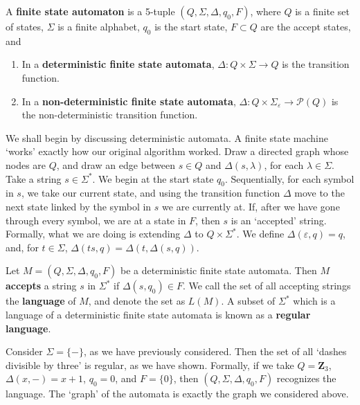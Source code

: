 \begin{definition}
    A {\bf finite state automaton} is a 5-tuple $(Q, \Sigma, \Delta, q_0, F)$, where $Q$ is a finite set of states, $\Sigma$ is a finite alphabet, $q_0$ is the start state, $F \subset Q$ are the accept states, and
    \begin{enumerate}
        \item In a {\bf deterministic finite state automata}, $\Delta: Q \times \Sigma \to Q$ is the transition function.
        \item In a {\bf non-deterministic finite state automata}, $\Delta: Q \times \Sigma_\varepsilon \to \mathcal{P}(Q)$ is the non-deterministic transition function.
    \end{enumerate}
\end{definition}

We shall begin by discussing deterministic automata. A finite state machine `works' exactly how our original algorithm worked. Draw a directed graph whose nodes are $Q$, and draw an edge between $s \in Q$ and $\Delta(s, \lambda)$, for each $\lambda \in \Sigma$. Take a string $s \in \Sigma^*$. We begin at the start state $q_0$. Sequentially, for each symbol in $s$, we take our current state, and using the transition function $\Delta$ move to the next state linked by the symbol in $s$ we are currently at. If, after we have gone through every symbol, we are at a state in $F$, then $s$ is an `accepted' string. Formally, what we are doing is extending $\Delta$ to $Q \times \Sigma^*$. We define $\Delta(\varepsilon, q) = q$, and, for $t \in \Sigma$, $\Delta(ts, q) = \Delta(t,\Delta(s,q))$.

\begin{definition}
    Let $M = (Q, \Sigma, \Delta, q_0, F)$ be a deterministic finite state automata. Then $M$ {\bf accepts} a string $s$ in $\Sigma^*$ if $\Delta(s,q_0) \in F$. We call the set of all accepting strings the {\bf language} of $M$, and denote the set as $L(M)$. A subset of $\Sigma^*$ which is a language of a deterministic finite state automata is known as a {\bf regular language}.
\end{definition}

\begin{example}
    Consider $\Sigma = \{ - \}$, as we have previously considered. Then the set of all `dashes divisible by three' is regular, as we have shown. Formally, if we take $Q = \mathbf{Z}_3$, $\Delta(x,-) = x+1$, $q_0 = 0$, and $F = \{ 0 \}$, then $(Q, \Sigma, \Delta, q_0, F)$ recognizes the language. The `graph' of the automata is exactly the graph we considered above.
\end{example}

